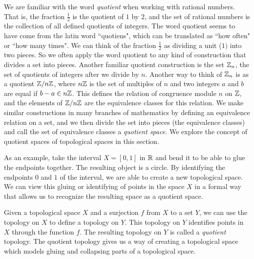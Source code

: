 \label{sec:quotients}


\vspace*{-17 pt}

\vspace*{13 pt}


We are familiar with the word \emph{quotient} when working with rational numbers. That is, the fraction $\frac{1}{2}$ is the quotient of $1$ by $2$, and the set of rational numbers is the collection of all defined quotients of integers. The word quotient seems to have come from the latin word ``quotiens", which can be translated as ``how often" or ``how many times". We can think of the fraction $\frac{1}{2}$ as dividing a unit ($1)$ into two pieces. So we often apply the word quotient to any kind of construction that divides a set into pieces. Another familiar quotient construction is the set $\mathbb{Z}_n$, the set of quotients of integers after we divide by $n$. Another way to think of $\mathbb{Z}_n$ is as a quotient $\mathbb{Z}/n\mathbb{Z}$, where $n\mathbb{Z}$ is the set of multiples of $n$ and two integers $a$ and $b$ are equal if $b-a \in n\mathbb{Z}$. This defines the relation of congruence module $n$ on $\mathbb{Z}$, and the elements of $\mathbb{Z}/n\mathbb{Z}$ are the equivalence classes for this relation. We make similar constructions in many branches of mathematics by defining an equivalence relation on a set, and we then divide the set into pieces (the equivalence classes) and call the set of equivalence classes a \emph{quotient space}. We explore the concept of quotient spaces of topological spaces in this section.

As an example, take the interval $X = [0,1]$ in $\mathbb{R}$ and bend it to be able to glue the endpoints together. The resulting object is a circle. By identifying the endpoints $0$ and $1$ of the interval, we are able to create a new topological space. We can view this gluing or identifying of points in the space $X$ in a formal way that allows us to recognize the resulting space as a quotient space. 


Given a topological space $X$ and a surjection $f$ from $X$ to a set $Y$, we can use the topology on $X$ to define a topology on $Y$. This topology on $Y$ identifies points in $X$ through the function $f$. The resulting topology on $Y$ is called a \emph{quotient} topology. The quotient topology gives us a way of creating a topological space which models gluing and collapsing parts of a topological space.

